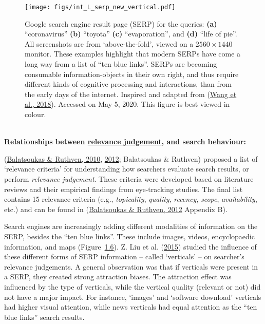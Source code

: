 \documentclass[a4paper, nobind]{templates/ociamthesis}
\begin{document}
\begin{figure}
\hypertarget{fig_int_L_serp_new_vertical}{%
\centering
\texttt{[image: figs/int\_L\_serp\_new\_vertical.pdf]}
\caption{Google search engine result page (SERP) for the queries: \textbf{(a)}
``coronavirus'' \textbf{(b)} ``toyota'' \textbf{(c)} ``evaporation'', and \textbf{(d)} ``life
of pie''. All screenshots are from `above-the-fold', viewed on a
\(2560 \times 1440\) monitor. These examples highlight that modern SERPs
have come a long way from a list of ``ten blue links''. SERPs are becoming
consumable information-objects in their own right, and thus require
different kinds of cognitive processing and interactions, than from the
early days of the internet. Inspired and adapted from
(\protect\hyperlink{ref-yue2018optimizing}{Wang et al., 2018}). Accessed on May 5, 2020. This figure is best
viewed in colour.}\label{fig_int_L_serp_new_vertical}
}
\end{figure}

~\\
\textbf{Relationships between \uline{relevance judgement}, and search
behaviour:}

(\protect\hyperlink{ref-114}{Balatsoukas \& Ruthven, 2010}, \protect\hyperlink{ref-119}{2012}; Balatsoukas \& Ruthven) proposed a list of `relevance criteria' for understanding
how searchers evaluate search results, or perform \emph{relevance judgement}.
These criteria were developed based on literature reviews and their
empirical findings from eye-tracking studies. The final list contains 15
relevance criteria (e.g., \emph{topicality}, \emph{quality}, \emph{recency}, \emph{scope},
\emph{availability}, etc.) and can be found in (\protect\hyperlink{ref-119}{Balatsoukas \& Ruthven, 2012} Appendix B).

Search engines are increasingly adding different modalities of
information on the SERP, besides the ``ten blue links''. These include
images, videos, encyclopaedic information, and maps
(Figure~\protect\hyperlink{fig_int_L_serp_new_vertical}{1.6}). Z. Liu et al. (\protect\hyperlink{ref-128}{2015}) studied the influence of
these different forms of SERP information -- called `verticals' -- on
searcher's relevance judgements. A general observation was that if
verticals were present in a SERP, they created strong attraction biases.
The attraction effect was influenced by the type of verticals, while the
vertical quality (relevant or not) did not have a major impact. For
instance, `images' and `software download' verticals had higher visual
attention, while news verticals had equal attention as the ``ten blue
links'' search results.
\end{document}
